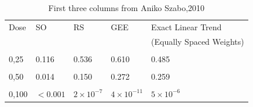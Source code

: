 \documentclass[12pt,oneside]{report}
\theoremstyle{definition}
\theoremstyle{mystyle}
\begin{document}
\begin{table}[h!]
	\begin{center}
		\begin{tabular}{ l l l l l}
			\hline\hline
			Dose& SO  &\hspace{5mm}RS&GEE &\hspace{5mm}Exact Linear Trend \\
			& &\hspace{5mm}& & \hspace{5mm}(Equally Spaced Weights) \\ \hline\hline
			&\\
			0,25& 0.116 &\hspace{5mm}0.536&0.610 &\hspace{5mm}0.485 \\\hline
			&\\
			0,50&0.014  &\hspace{5mm}0.150& 0.272  &\hspace{5mm}0.259\\
			&\\
			0,100 & $<0.001$ &\hspace{5mm}$2 \times 10^{-7}$& $4 \times 10^{-11}$ &\hspace{5mm}$5 \times 10^{-6}$\\
			\hline
		\end{tabular}
		\caption{First three columns from Aniko Szabo,2010}
		\label{tab:r}
	\end{center}
\end{table}	


\newpage	
\end{document}
